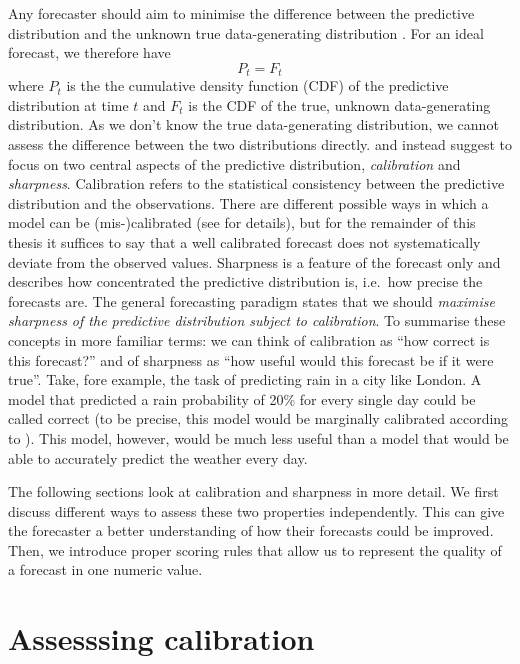 \documentclass[
]{book}
\begin{document}
Any forecaster should aim to minimise the difference between the predictive distribution and the unknown true data-generating distribution \citep{gneitingProbabilisticForecastsCalibration2007}. For an ideal forecast, we therefore have
\[ P_t = F_t \]
where \(P_t\) is the the cumulative density function (CDF) of the predictive distribution at time \(t\) and \(F_t\) is the CDF of the true, unknown data-generating distribution. As we don't know the true data-generating distribution, we cannot assess the difference between the two distributions directly. \citet{gneitingCalibratedProbabilisticForecasting2005} and \citet{gneitingProbabilisticForecastsCalibration2007} instead suggest to focus on two central aspects of the predictive distribution, \emph{calibration} and \emph{sharpness}. Calibration refers to the statistical consistency between the predictive distribution and the observations. There are different possible ways in which a model can be (mis-)calibrated (see \citet{gneitingProbabilisticForecastsCalibration2007} for details), but for the remainder of this thesis it suffices to say that a well calibrated forecast does not systematically deviate from the observed values. Sharpness is a feature of the forecast only and describes how concentrated the predictive distribution is, i.e.~how precise the forecasts are. The general forecasting paradigm states that we should \emph{maximise sharpness of the predictive distribution subject to calibration}. To summarise these concepts in more familiar terms: we can think of calibration as ``how correct is this forecast?'' and of sharpness as ``how useful would this forecast be if it were true''. Take, fore example, the task of predicting rain in a city like London. A model that predicted a rain probability of 20\% for every single day could be called correct (to be precise, this model would be marginally calibrated according to \citet{gneitingProbabilisticForecastsCalibration2007}). This model, however, would be much less useful than a model that would be able to accurately predict the weather every day.

The following sections look at calibration and sharpness in more detail. We first discuss different ways to assess these two properties independently. This can give the forecaster a better understanding of how their forecasts could be improved. Then, we introduce proper scoring rules that allow us to represent the quality of a forecast in one numeric value.

\hypertarget{assesssing-calibration}{%
\section{Assesssing calibration}\label{assesssing-calibration}}
\end{document}
